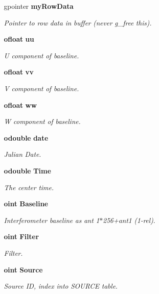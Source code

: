 \begin{CompactItemize}
gpointer {\bf my\-Row\-Data}
\begin{CompactList}\small\item\em Pointer to row data in buffer (never g\_\-free this). \item\end{CompactList}\item 
{\bf ofloat} {\bf uu}
\begin{CompactList}\small\item\em U component of baseline. \item\end{CompactList}\item 
{\bf ofloat} {\bf vv}
\begin{CompactList}\small\item\em V component of baseline. \item\end{CompactList}\item 
{\bf ofloat} {\bf ww}
\begin{CompactList}\small\item\em W component of baseline. \item\end{CompactList}\item 
{\bf odouble} {\bf date}
\begin{CompactList}\small\item\em Julian Date. \item\end{CompactList}\item 
{\bf odouble} {\bf Time}
\begin{CompactList}\small\item\em The center time. \item\end{CompactList}\item 
{\bf oint} {\bf Baseline}
\begin{CompactList}\small\item\em Interferometer baseline as ant 1$\ast$256+ant1 (1-rel). \item\end{CompactList}\item 
{\bf oint} {\bf Filter}
\begin{CompactList}\small\item\em Filter. \item\end{CompactList}\item 
{\bf oint} {\bf Source}
\begin{CompactList}\small\item\em Source ID, index into SOURCE table. \item\end{CompactList}\item 

\end{CompactItemize}
